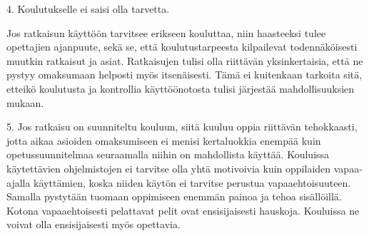 \documentclass[utf8,bachelor]{gradu3}
\begin{document}
4. Koulutukselle ei saisi olla tarvetta.

Jos ratkaisun käyttöön tarvitsee erikseen kouluttaa, niin haasteeksi tulee opettajien ajanpuute, sekä se, että koulutustarpeesta kilpailevat todennäköisesti muutkin ratkaisut ja asiat. Ratkaisujen tulisi olla riittävän yksinkertaisia, että ne pystyy omaksumaan helposti myös itsenäisesti. Tämä ei kuitenkaan tarkoita sitä, etteikö koulutusta ja kontrollia käyttöönotosta tulisi järjestää mahdollisuuksien mukaan.

5. Jos ratkaisu on suunniteltu kouluun, siitä kuuluu oppia riittävän tehokkaasti, jotta aikaa asioiden omaksumiseen ei menisi kertaluokkia enempää kuin opetussuunnitelmaa seuraamalla niihin on mahdollista käyttää. Kouluissa käytettävien ohjelmistojen ei tarvitse olla yhtä motivoivia kuin oppilaiden vapaa-ajalla käyttämien, koska niiden käytön ei tarvitse perustua vapaaehtoisuuteen. Samalla pystytään tuomaan oppimiseen enemmän painoa ja tehoa sisällöillä. Kotona vapaaehtoisesti pelattavat pelit ovat ensisijaisesti hauskoja. Kouluissa ne voivat olla ensisijaisesti myös opettavia.

\printbibliography
\end{document}

